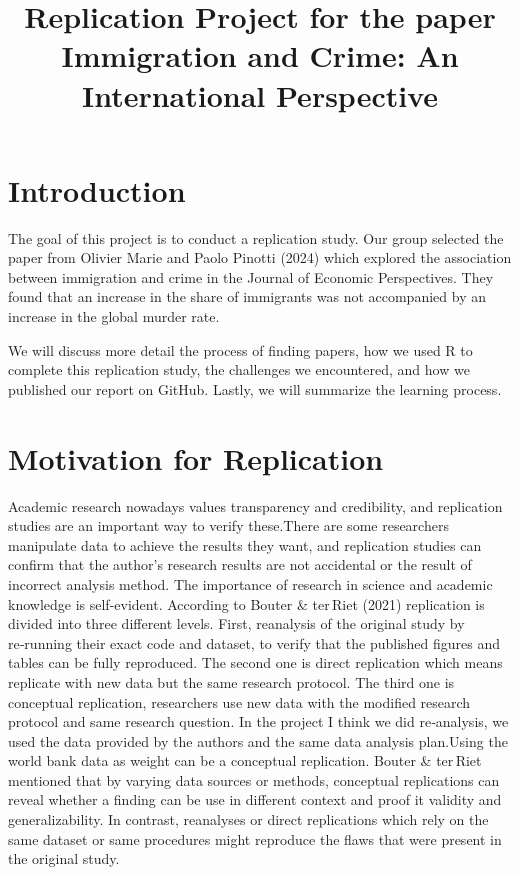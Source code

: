 \documentclass[
  jou,
  floatsintext,
  longtable,
  nolmodern,
  notxfonts,
  notimes,
  colorlinks=true,linkcolor=blue,citecolor=blue,urlcolor=blue]{apa7}
\title{Replication Project for the paper Immigration and Crime: An
International Perspective}
\begin{document}
\maketitle




\setlength\LTleft{0pt}


\setcounter{page}{9}


\section{Introduction}\label{introduction}

The goal of this project is to conduct a replication study. Our group
selected the paper from Olivier Marie and Paolo Pinotti (2024) which
explored the association between immigration and crime in the Journal of
Economic Perspectives. They found that an increase in the share of
immigrants was not accompanied by an increase in the global murder rate.

We will discuss more detail the process of finding papers, how we used R
to complete this replication study, the challenges we encountered, and
how we published our report on GitHub. Lastly, we will summarize the
learning process.

\section{Motivation for Replication}\label{motivation-for-replication}

Academic research nowadays values transparency and credibility, and
replication studies are an important way to verify these.There are some
researchers manipulate data to achieve the results they want, and
replication studies can confirm that the author's research results are
not accidental or the result of incorrect analysis method. The
importance of research in science and academic knowledge is
self-evident. According to Bouter \& ter\,Riet (2021) replication is
divided into three different levels. First, reanalysis of the original
study by re‑running their exact code and dataset, to verify that the
published figures and tables can be fully reproduced. The second one is
direct replication which means replicate with new data but the same
research protocol. The third one is conceptual replication, researchers
use new data with the modified research protocol and same research
question. In the project I think we did re‑analysis, we used the data
provided by the authors and the same data analysis plan.Using the world
bank data as weight can be a conceptual replication. Bouter \& ter\,Riet
mentioned that by varying data sources or methods, conceptual
replications can reveal whether a finding can be use in different
context and proof it validity and generalizability. In contrast,
reanalyses or direct replications which rely on the same dataset or same
procedures might reproduce the flaws that were present in the original
study.
\end{document}
